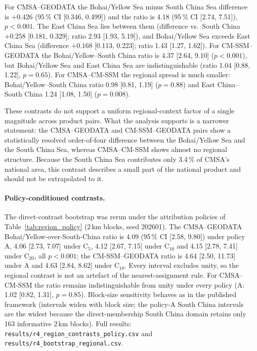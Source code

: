 \documentclass[11pt]{article}
\begin{document}
For CMSA--GEODATA the Bohai/Yellow Sea minus South China Sea difference is
$+0.426$ (95\,\% CI [0.346, 0.499]) and the ratio is 4.18 (95\,\% CI
[2.74, 7.51]), $p<0.001$. The East China Sea lies between them
(difference vs.\ South China $+0.258$ [0.181, 0.329]; ratio 2.93
[1.93, 5.19]), and Bohai/Yellow Sea exceeds East China Sea
(difference $+0.168$ [0.113, 0.223]; ratio 1.43 [1.27, 1.62]).
For CM-SSM--GEODATA the Bohai/Yellow--South China ratio is 4.37
[2.64, 9.10] ($p<0.001$), but Bohai/Yellow Sea and East China Sea are
indistinguishable (ratio 1.04 [0.88, 1.22], $p=0.65$). For CMSA--CM-SSM the
regional spread is much smaller: Bohai/Yellow--South China ratio 0.98
[0.81, 1.19] ($p=0.88$) and East China--South China 1.24 [1.08, 1.50]
($p=0.008$).

These contrasts do not support a uniform regional-context factor of a single
magnitude across product pairs. What the analysis
supports is a narrower statement: the CMSA--GEODATA and CM-SSM--GEODATA
pairs show a statistically resolved order-of-four difference between the
Bohai/Yellow Sea and the South China Sea, whereas CMSA--CM-SSM shows almost
no regional structure. Because the South China Sea contributes only
3.4\,\% of CMSA's national area, this contrast describes a small part of
the national product and should not be extrapolated to it.

\paragraph{Policy-conditioned contrasts.}
The direct-contrast bootstrap was rerun under the attribution policies of
Table~\ref{tab:region_policy} (2\,km blocks, seed 202601). The
CMSA--GEODATA Bohai/Yellow-over-South-China ratio is 4.09 (95\,\% CI
[2.58, 9.80]) under policy A, 4.06 [2.73, 7.07] under C$_5$, 4.12 [2.67,
7.15] under C$_{10}$ and 4.15 [2.78, 7.41] under C$_{20}$, all $p<0.001$;
the CM-SSM--GEODATA ratio is 4.64 [2.50, 11.73] under A and 4.63 [2.84,
8.62] under C$_{10}$. Every interval excludes unity, so the regional
contrast is not an artefact of the nearest-assignment rule. For
CMSA--CM-SSM the ratio remains indistinguishable from unity under every
policy (A: 1.02 [0.82, 1.31], $p=0.85$). Block-size sensitivity behaves as
in the published framework (intervals widen with block size; the policy-A
South China intervals are the widest because the direct-membership South
China domain retains only 163 informative 2\,km blocks). Full results:
\texttt{results/r4\_region\_contrasts\_policy.csv} and
\texttt{results/r4\_bootstrap\_regional.csv}.
\end{document}

